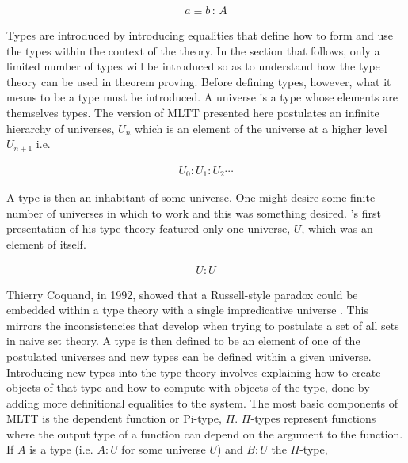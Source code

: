 \begin{align*}
    a \equiv b \, : \, A
\end{align*}

Types are introduced by introducing equalities that define how to form and use
the types within the context of the theory. In the section that follows, only a
limited number of types will be introduced so as to understand how the type
theory can be used in theorem proving. Before defining types, however, what it
means to be a type must be introduced. A universe is a type whose elements are
themselves types. The version of MLTT presented here postulates an infinite
hierarchy of universes, $U_{n}$ which is an element of the universe at a higher
level $U_{n+1}$ i.e.

\begin{align*}
    U_{0} : U_{1} : U_{2} \cdots
\end{align*}

A type is then an inhabitant of some universe. One might desire some finite
number of universes in which to work and this was something \mlt{} desired.
\mlt{}'s first presentation of his type theory featured only one universe,
$U$, which was an element of itself.

\begin{align*}
    U : U
\end{align*}

Thierry Coquand, in 1992, showed that a Russell-style paradox could be embedded
within a type theory with a single impredicative universe
\cite{coquand1992paradox}. This mirrors the
inconsistencies that develop when trying to postulate a set of all sets in naive
set theory. A type is then defined to be an element of one of the postulated
universes and new types can be defined within a given universe. Introducing new
types into the type theory involves explaining how to create objects of that
type and how to compute with objects of the type, done by adding more
definitional equalities to the system.  The most basic components of MLTT is the
dependent function or Pi-type, $\Pi$. $\Pi$-types represent functions where the
output type of a function can depend on the argument to the function.  If $A$ is
a type (i.e. $A : U$ for some universe $U$) and $B : U$  the $\Pi$-type,

